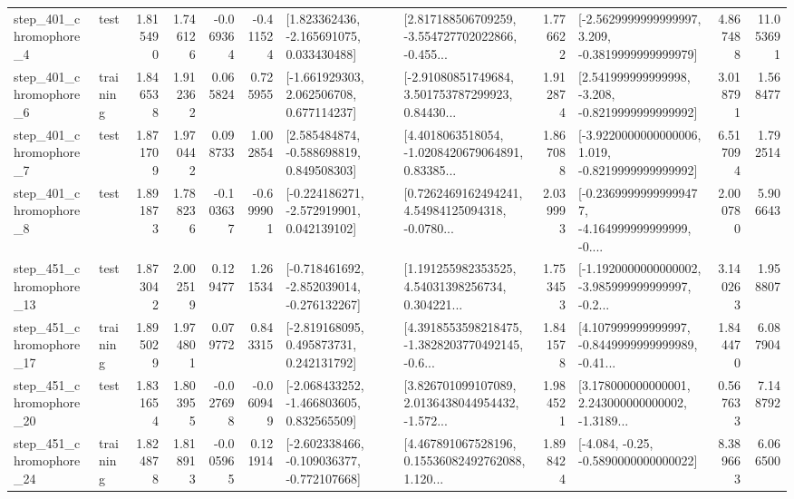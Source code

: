 \begin{tabular}{llrrrrllrlrr}
   step\_401\_chromophore\_4 &      test &      1.815490 &    1.746126 &     -0.069364 & -0.411524 &    [1.823362436, -2.165691075, 0.033430488] &  [2.817188506709259, -3.554727702022866, -0.455... &       1.776622 &  [-2.5629999999999997, 3.209, -0.3819999999999979] &            4.867488 &         11.053691 \\
   step\_401\_chromophore\_6 &  training &      1.846538 &    1.912362 &      0.065824 &  0.725955 &    [-1.661929303, 2.062506708, 0.677114237] &  [-2.91080851749684, 3.501753787299923, 0.84430... &       1.912874 &   [2.541999999999998, -3.208, -0.8219999999999992] &            3.018791 &          1.568477 \\
   step\_401\_chromophore\_7 &      test &      1.871709 &    1.970442 &      0.098733 &  1.002854 &    [2.585484874, -0.588698819, 0.849508303] &  [4.4018063518054, -1.0208420679064891, 0.83385... &       1.867088 &  [-3.9220000000000006, 1.019, -0.8219999999999992] &            6.517094 &          1.792514 \\
   step\_401\_chromophore\_8 &      test &      1.891873 &    1.788236 &     -0.103637 & -0.699901 &   [-0.224186271, -2.572919901, 0.042139102] &  [0.7262469162494241, 4.54984125094318, -0.0780... &       2.039993 &  [-0.23699999999999477, -4.164999999999999, -0.... &            2.000780 &          5.906643 \\
  step\_451\_chromophore\_13 &      test &      1.873042 &    2.002519 &      0.129477 &  1.261534 &  [-0.718461692, -2.852039014, -0.276132267] &  [1.191255982353525, 4.54031398256734, 0.304221... &       1.753453 &  [-1.1920000000000002, -3.985999999999997, -0.2... &            3.140263 &          1.958807 \\
  step\_451\_chromophore\_17 &  training &      1.895029 &    1.974801 &      0.079772 &  0.843315 &    [-2.819168095, 0.495873731, 0.242131792] &  [4.3918553598218475, -1.3828203770492145, -0.6... &       1.841578 &  [4.107999999999997, -0.8449999999999989, -0.41... &            1.844470 &          6.087904 \\
  step\_451\_chromophore\_20 &      test &      1.831654 &    1.803955 &     -0.027698 & -0.060949 &   [-2.068433252, -1.466803605, 0.832565509] &  [3.826701099107089, 2.0136438044954432, -1.572... &       1.984521 &  [3.178000000000001, 2.243000000000002, -1.3189... &            0.567633 &          7.148792 \\
  step\_451\_chromophore\_24 &  training &      1.824878 &    1.818913 &     -0.005965 &  0.121914 &  [-2.602338466, -0.109036377, -0.772107668] &  [4.467891067528196, 0.15536082492762088, 1.120... &       1.898424 &               [-4.084, -0.25, -0.5890000000000022] &            8.389663 &          6.066500 \\

\end{tabular}

